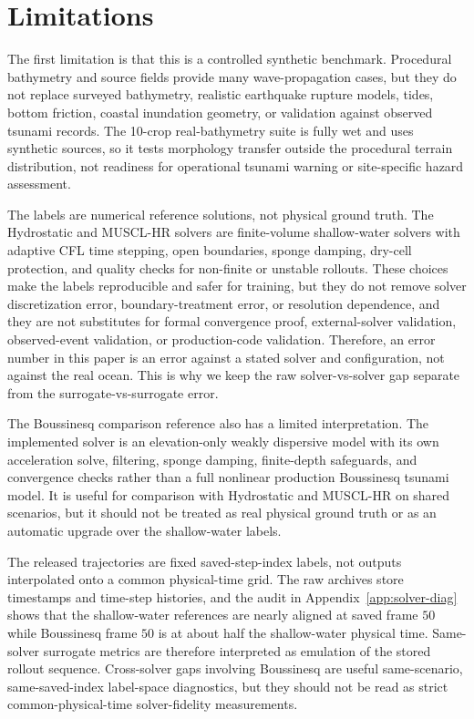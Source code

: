 \section{Limitations}
\label{sec:limitations}

The first limitation is that this is a controlled synthetic benchmark. Procedural bathymetry and source fields provide many wave-propagation cases, but they do not replace surveyed bathymetry, realistic earthquake rupture models, tides, bottom friction, coastal inundation geometry, or validation against observed tsunami records. The 10-crop real-bathymetry suite is fully wet and uses synthetic sources, so it tests morphology transfer outside the procedural terrain distribution, not readiness for operational tsunami warning or site-specific hazard assessment.

The labels are numerical reference solutions, not physical ground truth. The Hydrostatic and MUSCL-HR solvers are finite-volume shallow-water solvers with adaptive CFL time stepping, open boundaries, sponge damping, dry-cell protection, and quality checks for non-finite or unstable rollouts. These choices make the labels reproducible and safer for training, but they do not remove solver discretization error, boundary-treatment error, or resolution dependence, and they are not substitutes for formal convergence proof, external-solver validation, observed-event validation, or production-code validation. Therefore, an error number in this paper is an error against a stated solver and configuration, not against the real ocean. This is why we keep the raw solver-vs-solver gap separate from the surrogate-vs-surrogate error.

The Boussinesq comparison reference also has a limited interpretation. The implemented solver is an elevation-only weakly dispersive model with its own acceleration solve, filtering, sponge damping, finite-depth safeguards, and convergence checks rather than a full nonlinear production Boussinesq tsunami model. It is useful for comparison with Hydrostatic and MUSCL-HR on shared scenarios, but it should not be treated as real physical ground truth or as an automatic upgrade over the shallow-water labels.

The released trajectories are fixed saved-step-index labels, not outputs interpolated onto a common physical-time grid. The raw archives store timestamps and time-step histories, and the audit in Appendix~\ref{app:solver-diag} shows that the shallow-water references are nearly aligned at saved frame $50$ while Boussinesq frame $50$ is at about half the shallow-water physical time. Same-solver surrogate metrics are therefore interpreted as emulation of the stored rollout sequence. Cross-solver gaps involving Boussinesq are useful same-scenario, same-saved-index label-space diagnostics, but they should not be read as strict common-physical-time solver-fidelity measurements.

